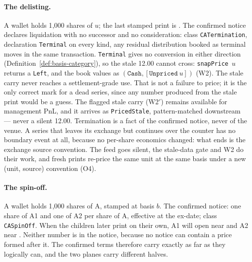\paragraph{The delisting.} A wallet holds 1{,}000 shares of $u$; the last
stamped print is . The confirmed notice declares liquidation with
no successor and no consideration: class \texttt{CATermination}, declaration
\texttt{Terminal} on every kind, any residual distribution booked as terminal
moves in the same transaction. \texttt{Terminal} gives no conversion in
either direction (Definition~\ref{def:basis-category}), so the stale 12.00
cannot cross: \texttt{snapPrice}~$u$ returns a \texttt{Left}, and the book
values as $(\texttt{Cash},[\texttt{Unpriced}\ u])$ (W2). The 
stale carry never reaches a settlement-grade use. That is not a failure to
price; it is the only correct mark for a dead series, since any number
produced from the stale print would be a guess. The flagged stale carry
(W2$'$) remains available for management PnL, and it arrives as
\texttt{PricedStale}, pattern-matched downstream --- never a silent 12.00.
Termination is a fact of the confirmed notice, never of the venue. A series
that leaves its exchange but continues over the counter has no boundary event
at all, because no per-share economics changed: what ends is the exchange
source convention. The feed goes silent, the stale-data gate and W2 do their
work, and fresh prints re-price the same unit at the same basis under a new
(unit, source) convention (O4).

\paragraph{The spin-off.} A wallet holds 1{,}000 shares of A, stamped
 at basis $b$. The confirmed notice: one share of A1 and one of A2
per share of A, effective at the ex-date; class \texttt{CASpinOff}. When the
children later print on their own, A1 will open near  and A2 near
. Neither number is in the notice, because no notice can contain a
price formed after it. The confirmed terms therefore carry exactly as far as
they logically can, and the two planes carry different halves.

